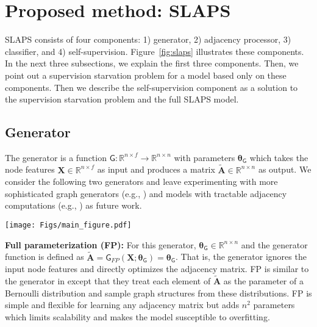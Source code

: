 \documentclass{article}
\def\mA{{\bm{A}}}
\def\mX{{\bm{X}}}
\newcommand{\func}[1]{\ensuremath{\mathsf{#1}}}
\begin{document}
\section{Proposed method: SLAPS}
SLAPS consists of four components: 1) generator, 2) adjacency processor, 3) classifier, and 4) self-supervision. 
Figure~\ref{fig:slaps} illustrates these components. In the next three subsections, we explain the first three components. Then, we point out a supervision starvation problem for a model based only on these components. Then we describe the self-supervision component as a solution to the supervision starvation problem and the full SLAPS model.

\subsection{Generator} \label{sec:generator}
The generator is a function $\func{G}: \mathbb{R}^{n\times f} \rightarrow \mathbb{R}^{n\times n}$ with parameters $\bm{\theta}_\func{G}$ which takes the node features $\mX \in\mathbb{R}^{n\times f}$ as input and produces a matrix $\tilde{\mA}\in\mathbb{R}^{n\times n}$ as output. We consider the following two generators and leave experimenting with more sophisticated graph generators (e.g., \citep{you2018graphrnn,liu2019graph,liao2019efficient}) and models with tractable adjacency computations (e.g., \citep{choromanski2020rethinking}) as future work.

\begin{figure*}[t]
   \centering
   \texttt{[image: Figs/main\_figure.pdf]}
   \caption{\label{fig:slaps} Overview of SLAPS. At the top, a generator receives the node features and produces a non-symmetric, non-normalized adjacency having (possibly) both positive and negative values (Section~\ref{sec:generator}). The adjacency processor makes the values positive, symmetrizes and normalizes the adjacency (Section~\ref{sec:processor}). The resulting adjacency and the node features go into $\func{GNN_C}$ which predicts the node classes (Section~\ref{sec:classifier}). At the bottom, some noise is added to the node features. The resulting noisy features and the generated adjacency go into $\func{GNN_{DAE}}$ which then denoises the features (Section~\ref{sec:self-supervision}).}
\end{figure*}

\textbf{Full parameterization (FP):} For this generator, $\bm{\theta}_\func{G}\in\mathbb{R}^{n\times n}$ and the generator function is defined as $\tilde{\mA}=\func{G}_{FP}(\mX; \bm{\theta}_\func{G})=\bm{\theta}_\func{G}$. That is, the generator ignores the input node features and directly optimizes the adjacency matrix. 
FP is similar to the generator in \cite{franceschi2019learning} except that they treat each element of $\tilde{\mA}$ as the parameter of a Bernoulli distribution and sample graph structures from these distributions. FP is simple and flexible for learning any adjacency matrix but adds $n^2$ parameters which limits scalability and makes the model susceptible to overfitting.
\end{document}
